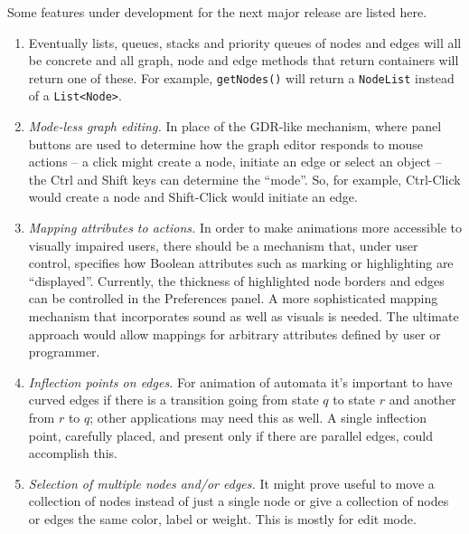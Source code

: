 Some features under development for the next major release are listed here.

\begin{enumerate}
\item \label{item:data_structures}
  Eventually
  lists, queues, stacks and priority queues of nodes and edges will all be
  concrete and all graph, node and edge methods that return containers will
  return one of these. For example, \texttt{getNodes()} will return a
  \texttt{NodeList} instead of a \texttt{List<Node>}.

\item
  \emph{Mode-less graph editing.}
  In place of the GDR-like mechanism, where panel buttons are used to determine
  how the graph editor responds to mouse actions -- a click might create a node,
  initiate an edge or select an object --
  the \textsf{Ctrl} and \textsf{Shift} keys can determine the ``mode''.
  So, for example, \textsf{Ctrl-Click} would create a node and
  \textsf{Shift-Click} would initiate an edge.

\item
  \emph{Mapping attributes to actions.}
  In order to make animations more accessible to visually impaired users,
  there should be a mechanism that, under user control, specifies how Boolean
  attributes such as marking or highlighting are ``displayed''.
  Currently, the thickness of highlighted node borders and edges can be
  controlled in the \textsf{Preferences} panel.
  A more sophisticated mapping mechanism that incorporates sound as well as visuals is needed.
  The ultimate approach would allow mappings for arbitrary attributes
  defined by user or programmer.

\item \emph{Inflection points on edges.}  For animation of automata it's
  important to have curved edges if there is a transition going from state
  $q$ to state $r$ and another from $r$ to $q$; other applications may need
  this as well. A single inflection point, carefully placed, and present only
  if there are parallel edges, could accomplish this.

\item \emph{Selection of multiple nodes and/or edges.}  It might prove useful
  to move a collection of nodes instead of just a single node or give a
  collection of nodes or edges the same color, label or weight. This is
  mostly for edit mode.
\end{enumerate}
